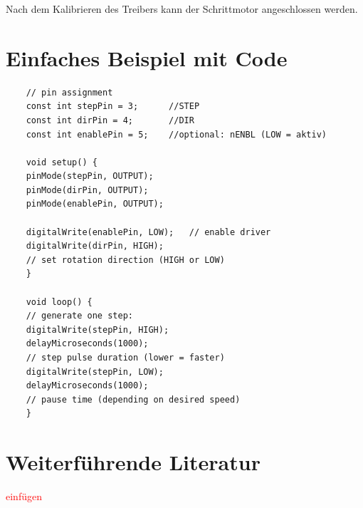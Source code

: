 Nach dem Kalibrieren des Treibers kann der Schrittmotor angeschlossen werden. 
 

\section{Einfaches Beispiel mit Code}

\begin{lstlisting}
	// pin assignment
	const int stepPin = 3;		//STEP
	const int dirPin = 4;		//DIR
	const int enablePin = 5;	//optional: nENBL (LOW = aktiv)
	
	void setup() {
	pinMode(stepPin, OUTPUT);
	pinMode(dirPin, OUTPUT);
	pinMode(enablePin, OUTPUT);
	
	digitalWrite(enablePin, LOW);	// enable driver
	digitalWrite(dirPin, HIGH);		
	// set rotation direction (HIGH or LOW)
	}
	
	void loop() {
	// generate one step:
	digitalWrite(stepPin, HIGH);
	delayMicroseconds(1000);		
	// step pulse duration (lower = faster)
	digitalWrite(stepPin, LOW);
	delayMicroseconds(1000);		
	// pause time (depending on desired speed)
	}
\end{lstlisting}

\section{Weiterführende Literatur}

\textcolor{red}{einfügen}
